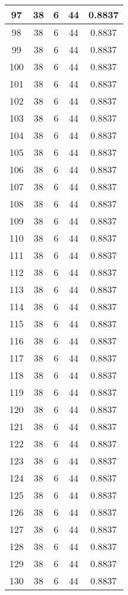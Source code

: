 \documentclass[letterpaper, 12pt]{article}
\begin{document}
\begin{longtable}{|c|c|c|c|c|}
\hline
97 & 38 & 6 & 44 & 0.8837 \\
\hline
98 & 38 & 6 & 44 & 0.8837 \\
\hline
99 & 38 & 6 & 44 & 0.8837 \\
\hline
100 & 38 & 6 & 44 & 0.8837 \\
\hline
101 & 38 & 6 & 44 & 0.8837 \\
\hline
102 & 38 & 6 & 44 & 0.8837 \\
\hline
103 & 38 & 6 & 44 & 0.8837 \\
\hline
104 & 38 & 6 & 44 & 0.8837 \\
\hline
105 & 38 & 6 & 44 & 0.8837 \\
\hline
106 & 38 & 6 & 44 & 0.8837 \\
\hline
107 & 38 & 6 & 44 & 0.8837 \\
\hline
108 & 38 & 6 & 44 & 0.8837 \\
\hline
109 & 38 & 6 & 44 & 0.8837 \\
\hline
110 & 38 & 6 & 44 & 0.8837 \\
\hline
111 & 38 & 6 & 44 & 0.8837 \\
\hline
112 & 38 & 6 & 44 & 0.8837 \\
\hline
113 & 38 & 6 & 44 & 0.8837 \\
\hline
114 & 38 & 6 & 44 & 0.8837 \\
\hline
115 & 38 & 6 & 44 & 0.8837 \\
\hline
116 & 38 & 6 & 44 & 0.8837 \\
\hline
117 & 38 & 6 & 44 & 0.8837 \\
\hline
118 & 38 & 6 & 44 & 0.8837 \\
\hline
119 & 38 & 6 & 44 & 0.8837 \\
\hline
120 & 38 & 6 & 44 & 0.8837 \\
\hline
121 & 38 & 6 & 44 & 0.8837 \\
\hline
122 & 38 & 6 & 44 & 0.8837 \\
\hline
123 & 38 & 6 & 44 & 0.8837 \\
\hline
124 & 38 & 6 & 44 & 0.8837 \\
\hline
125 & 38 & 6 & 44 & 0.8837 \\
\hline
126 & 38 & 6 & 44 & 0.8837 \\
\hline
127 & 38 & 6 & 44 & 0.8837 \\
\hline
128 & 38 & 6 & 44 & 0.8837 \\
\hline
129 & 38 & 6 & 44 & 0.8837 \\
\hline
130 & 38 & 6 & 44 & 0.8837 \\

\end{longtable}
\end{document}
